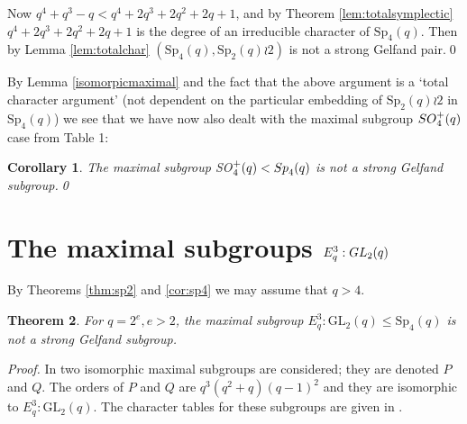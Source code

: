 \documentclass[10pt,a4paper]{amsart}
\newtheorem{thm}{Theorem}[section]
\newtheorem{cor}[thm]{Corollary}
\theoremstyle{plain}
\theoremstyle{definition}
\numberwithin{equation}{section}
\begin{document}
Now $q^4+q^3-q < q^4+2q^3+2q^2+2q+1$, and  by Theorem  \ref{lem:totalsymplectic}   $q^4+2q^3+2q^2+2q+1$ is the degree of an irreducible character of $\mathrm{Sp}_4(q)$. Then by Lemma \ref{lem:totalchar}  $(\mathrm{Sp}_4(q), \mathrm{Sp}_2(q)\wr 2)$ is not a strong Gelfand pair.\qed\medskip 

By Lemma \ref {isomorpicmaximal} and the fact that the above argument is a `total character argument' (not dependent on the particular embedding of $ \mathrm{Sp}_2(q)\wr 2$ in $\mathrm{Sp}_4(q)$)        we see that we have now also dealt with  the maximal subgroup ${\rm SO}^+_4(q)$ case from Table 1:

\begin{cor} \label{cor1} The maximal subgroup {\rm SO}$^+_4(q)<{\rm Sp}_4(q)$ is not a strong Gelfand subgroup.\qed
\end{cor}\medskip
 


\section {The maximal subgroups $E_q^3:{\rm GL}_2(q)$}

By Theorems \ref {thm:sp2} and \ref {cor:sp4}  we may assume that $q>4$.
\begin{thm}\label{thm:elementaryabelian}
For $q=2^e, e>2$, the maximal subgroup $E_q^3\colon\mathrm{GL}_2(q) \leq \mathrm{Sp}_4(q)$ is not a strong Gelfand subgroup.
\end{thm}
\noindent\textit{Proof.} In \cite{speven} two isomorphic maximal subgroups are considered; they are denoted $P$ and $Q$. 
The orders of $P$ and $Q$ are $q^3(q^2+q)(q-1)^2$ and they are isomorphic to  $E_q^3\colon\mathrm{GL}_2(q)$. The character tables for these subgroups are given in \cite{speven}. 
\end{document}
